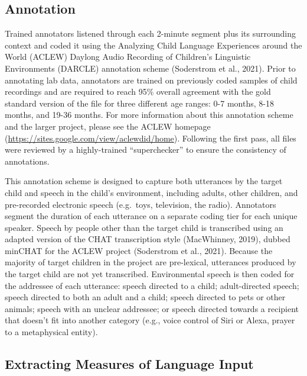 \documentclass[
  man,floatsintext]{apa6}
\begin{document}
\hypertarget{annotation}{%
\subsection{Annotation}\label{annotation}}

Trained annotators listened through each 2-minute segment plus its surrounding context and coded it using the Analyzing Child Language Experiences around the World (ACLEW) Daylong Audio Recording of Children's Linguistic Environments (DARCLE) annotation scheme (Soderstrom et al., 2021). Prior to annotating lab data, annotators are trained on previously coded samples of child recordings and are required to reach 95\% overall agreement with the gold standard version of the file for three different age ranges: 0-7 months, 8-18 months, and 19-36 months. For more information about this annotation scheme and the larger project, please see the ACLEW homepage (\url{https://sites.google.com/view/aclewdid/home}). Following the first pass, all files were reviewed by a highly-trained ``superchecker'' to ensure the consistency of annotations.

This annotation scheme is designed to capture both utterances by the target child and speech in the child's environment, including adults, other children, and pre-recorded electronic speech (e.g.~toys, television, the radio). Annotators segment the duration of each utterance on a separate coding tier for each unique speaker. Speech by people other than the target child is transcribed using an adapted version of the CHAT transcription style (MacWhinney, 2019), dubbed minCHAT for the ACLEW project (Soderstrom et al., 2021). Because the majority of target children in the project are pre-lexical, utterances produced by the target child are not yet transcribed. Environmental speech is then coded for the addressee of each utterance: speech directed to a child; adult-directed speech; speech directed to both an adult and a child; speech directed to pets or other animals; speech with an unclear addressee; or speech directed towards a recipient that doesn't fit into another category (e.g., voice control of Siri or Alexa, prayer to a metaphysical entity).

\hypertarget{extracting-measures-of-language-input}{%
\subsection{Extracting Measures of Language Input}\label{extracting-measures-of-language-input}}
\end{document}
